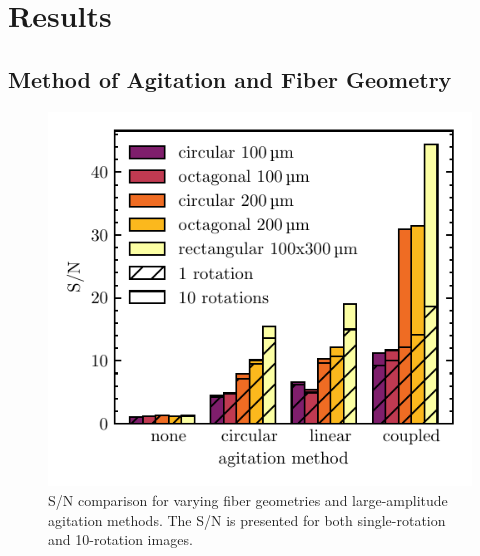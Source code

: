 \section{Results}
\label{sec:results}

\subsection{Method of Agitation and Fiber Geometry}
\label{subsec:ag_snr}

\begin{figure}
\centering
	\includegraphics[width=\columnwidth]{figures-2/ag_snr.pdf}
	\caption{S/N comparison for varying fiber geometries and large-amplitude agitation methods. The S/N is presented for both single-rotation and 10-rotation images.}
\label{fig:ag_snr}
\end{figure}

